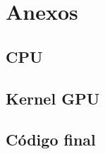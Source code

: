 \renewcommand{\thechapter}{\Alph{chapter}}
\renewcommand{\thesection}{\Alph{chapter}.\arabic{section}}
\setcounter{chapter}{0}
\chapter{Anexos}
\section{CPU}

\newpage

\section{Kernel GPU}
\label{secA:kernel}

\newpage

\section{Código final}
